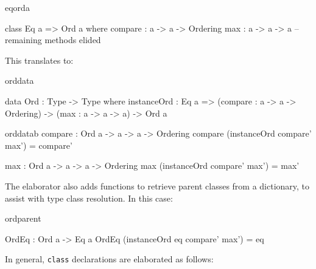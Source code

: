 \begin{SaveVerbatim}{eqorda}

class Eq a => Ord a where
    compare : a -> a -> Ordering
    max : a -> a -> a
    -- remaining methods elided

\end{SaveVerbatim}

\noindent
This translates to:

\begin{SaveVerbatim}{orddata}

data Ord : Type -> Type where
    instanceOrd : Eq a => (compare : a -> a -> Ordering) -> 
                          (max : a -> a -> a) ->  Ord a 

\end{SaveVerbatim}

\begin{SaveVerbatim}{orddatab}
compare : Ord a -> a -> a -> Ordering
compare (instanceOrd compare' max') = compare'

max : Ord a -> a -> a -> Ordering
max (instanceOrd compare' max') = max'

\end{SaveVerbatim}


\noindent
The elaborator also adds functions to retrieve parent classes from a dictionary, to assist
with type class resolution. In this case:

\begin{SaveVerbatim}{ordparent}

OrdEq : Ord a -> Eq a
OrdEq (instanceOrd {{eq}} compare' max') = eq

\end{SaveVerbatim}

\noindent
In general, \texttt{class} declarations are elaborated as follows:



